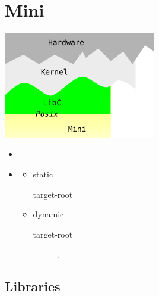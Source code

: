 \section{Mini}
\begin{frame}
\begin{center}
\includegraphics[width=0.5\textwidth]{mini.pdf}
\end{center}
\vspace{-5mm}
\begin{itemize}
 \item {}
 \item {}
 \begin{itemize}
  \item static
  \begin{description}
   \item[target-root] 
  \end{description}
  \item dynamic
  \begin{description}
   \item[target-root] , 
  \end{description}
 \end{itemize}
\end{itemize}
\end{frame}

\subsection{Libraries}

